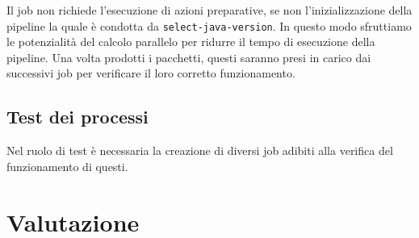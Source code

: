 

Il job non richiede l'esecuzione di azioni preparative, se non l'inizializzazione della pipeline la quale è condotta da \texttt{select-java-version}. In questo modo sfruttiamo le potenzialità del calcolo parallelo per ridurre il tempo di esecuzione della pipeline. Una volta prodotti i pacchetti, questi saranno presi in carico dai successivi job per verificare il loro corretto funzionamento.

\subsection{Test dei processi}

Nel ruolo di test è necessaria la creazione di diversi job adibiti alla verifica del funzionamento di questi.



\section{Valutazione}

